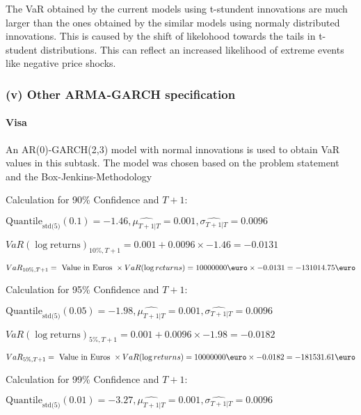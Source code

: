 The VaR obtained by the current models using t-stundent innovations are much larger than the ones obtained by the similar models using normaly distributed innovations. This is caused by the shift of likelohood towards the tails in t-student distributions. This can reflect an increased likelihood of extreme events like negative price shocks.
\subsubsection{(v) Other ARMA-GARCH specification}

\paragraph{Visa}
 An AR(0)-GARCH(2,3) model with normal innovations is used to obtain VaR values in this subtask. The model was chosen based on the problem statement and the Box-Jenkins-Methodology





Calculation for 90\% Confidence and $T+1$:

\indent\indent $\text{Quantile}_\text{std(5)}(0.1) = -1.46,\hat{\mu_{T+1|T}} = 0.001, \hat{\sigma_{T+1|T}} = 0.0096$

\indent\indent $VaR(\log \text{returns})_{10\%, T + 1} = 0.001 + 0.0096\times-1.46 = -0.0131$

\indent\indent $VaR_{10\%, T + 1} = \text{ Value in Euros } \times VaR(\log returns) = 10 000 000 \text{\euro} \times-0.0131 = -131014.75 \text{\euro}$\newline




Calculation for 95\% Confidence and $T+1$:

\indent\indent $\text{Quantile}_\text{std(5)}(0.05) = -1.98,\hat{\mu_{T+1|T}} = 0.001, \hat{\sigma_{T+1|T}} = 0.0096$

\indent\indent $VaR(\log \text{returns})_{5\%, T + 1} = 0.001 + 0.0096\times-1.98 = -0.0182$

\indent\indent $VaR_{5\%, T + 1} = \text{ Value in Euros } \times VaR(\log returns) = 10 000 000 \text{\euro} \times-0.0182 = -181531.61 \text{\euro}$\newline




Calculation for 99\% Confidence and $T+1$:

\indent\indent $\text{Quantile}_\text{std(5)}(0.01) = -3.27,\hat{\mu_{T+1|T}} = 0.001, \hat{\sigma_{T+1|T}} = 0.0096$

